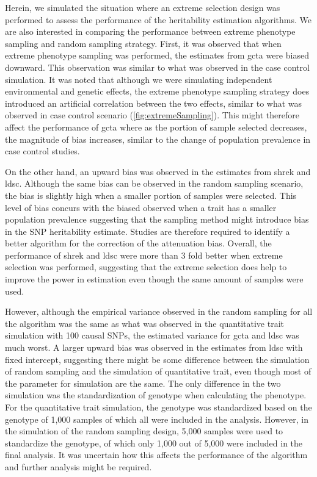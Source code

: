 	Herein, we simulated the situation where an extreme selection design was performed to assess the performance of the heritability estimation algorithms.
	We are also interested in comparing the performance between extreme phenotype sampling and random sampling strategy.
	First, it was observed that when extreme phenotype sampling was performed, the estimates from \gls{gcta} were biased downward. 
	This observation was similar to what was observed in the case control simulation.
	It was noted that although we were simulating independent environmental and genetic effects, the extreme phenotype sampling strategy does introduced an artificial correlation between the two effects, similar to what was observed in case control scenario (\cref{fig:extremeSampling}).
	This might therefore affect the performance of \gls{gcta} where as the portion of sample selected decreases, the magnitude of bias increases, similar to the change of population prevalence in case control studies. 
	
	On the other hand, an upward bias was observed in the estimates from \gls{shrek} and \gls{ldsc}.
	Although the same bias can be observed in the random sampling scenario, the bias is slightly high when a smaller portion of samples were selected.
	This level of bias concurs with the biased observed when a trait has a smaller population prevalence suggesting that the sampling method might introduce bias in the \gls{SNP} heritability estimate.
	Studies are therefore required to identify a better algorithm for the correction of the attenuation bias. 
	Overall, the performance of \gls{shrek} and \gls{ldsc} were more than 3 fold better when extreme selection was performed, suggesting that the extreme selection does help to improve the power in estimation even though the same amount of samples were used.
	
	However, although the empirical variance observed in the random sampling for all the algorithm was the same as what was observed in the quantitative trait simulation with 100 causal \glspl{SNP}, the estimated variance for \gls{gcta} and \gls{ldsc} was much worst.
	A larger upward bias was observed in the estimates from \gls{ldsc} with fixed intercept, suggesting there might be some difference between the simulation of random sampling and the simulation of quantitative trait, even though most of the parameter for simulation are the same.
	The only difference in the two simulation was the standardization of genotype when calculating the phenotype.
	For the quantitative trait simulation, the genotype was standardized based on the genotype of 1,000 samples of which all were included in the analysis. 
	However, in the simulation of the random sampling design, 5,000 samples were used to standardize the genotype, of which only 1,000 out of 5,000 were included in the final analysis.
	It was uncertain how this affects the performance of the algorithm and further analysis might be required.
	

